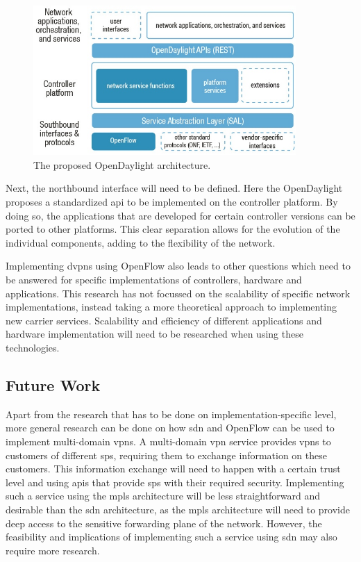 \begin{figure}[!h]
	\centering
	\includegraphics[width=10cm]{./includes/opendaylight.jpg}
	\caption{The proposed OpenDaylight architecture.}
	\label{fig:opendaylight}
\end{figure}

Next, the northbound interface will need to be defined. Here the OpenDaylight proposes a standardized \ac{api} to be implemented on the controller platform. By doing so, the applications that are developed for certain controller versions can be ported to other platforms. This clear separation allows for the evolution of the individual components, adding to the flexibility of the network.

Implementing \acp{dvpn} using OpenFlow also leads to other questions which need to be answered for specific implementations of controllers, hardware and applications. This research has not focussed on the scalability of specific network implementations, instead taking a more theoretical approach to implementing new carrier services. Scalability and efficiency of different applications and hardware implementation will need to be researched when using these technologies. 


\subsection{Future Work} %
\label{sub:future_work}

Apart from the research that has to be done on implementation-specific level, more general research can be done on how \ac{sdn} and OpenFlow can be used to implement multi-domain \acp{vpn}. A multi-domain \ac{vpn} service provides \acp{vpn} to customers of different \acp{sp}, requiring them to exchange information on these customers. This information exchange will need to happen with a certain trust level and using \acp{api} that provide \acp{sp} with their required security. Implementing such a service using the \ac{mpls} architecture will be less straightforward and desirable than the \ac{sdn} architecture, as the \ac{mpls} architecture will need to provide deep access to the sensitive forwarding plane of the network. However, the feasibility and implications of implementing such a service using \ac{sdn} may also require more research.

